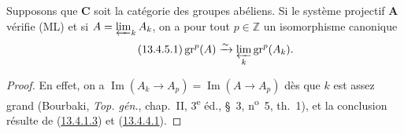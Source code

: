 \begin{corollary}[13.4.5]
\label{0.13.4.5-fr}
Supposons que $\boldsymbol{C}$ soit la catégorie des groupes abéliens. Si le
système projectif $\mathbf A$ vérifie \textup{(ML)} et si
$A=\varprojlim_k A_k$, on a pour tout $p\in\mathbb Z$ un isomorphisme
canonique
\begin{equation}
\label{0.13.4.5.1-fr}
\tag{13.4.5.1}
\operatorname{gr}^p(A)\xrightarrow{\sim}
\varprojlim_k\operatorname{gr}^p(A_k).
\end{equation}
\end{corollary}
\begin{proof}
En effet, on a
$\operatorname{Im}(A_k\to A_p)=\operatorname{Im}(A\to A_p)$ dès que $k$
est assez grand (Bourbaki, \emph{Top. gén.}, chap.~II,
3\textsuperscript{e} éd., §~3, n\textsuperscript{o}~5, th.~1), et la
conclusion résulte de
(\hyperref[0.13.4.1.3-fr]{13.4.1.3}) et
(\hyperref[0.13.4.4.1-fr]{13.4.4.1}).
\end{proof}


